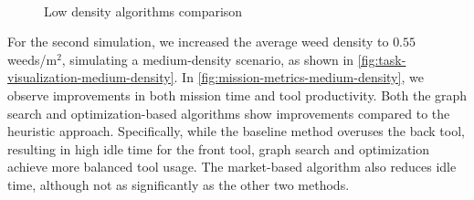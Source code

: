 \begin{figure}[htb]
    \myfloatalign
     \quad
     \\
    \caption{Low density algorithms comparison}\label{fig:results-low-density}
\end{figure}

For the second simulation, we increased the average weed density to $0.55$ weeds/m$^2$, simulating a medium-density scenario, as shown in \autoref{fig:task-visualization-medium-density}. In \autoref{fig:mission-metrics-medium-density}, we observe improvements in both mission time and tool productivity. Both the graph search and optimization-based algorithms show improvements compared to the heuristic approach. Specifically, while the baseline method overuses the back tool, resulting in high idle time for the front tool, graph search and optimization achieve more balanced tool usage. The market-based algorithm also reduces idle time, although not as significantly as the other two methods.

